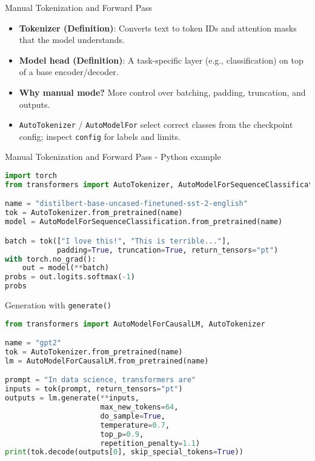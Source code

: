 \documentclass[aspectratio=169]{beamer}
\begin{document}
\begin{frame}[fragile]{Manual Tokenization and Forward Pass}
  \begin{itemize}
    \item \textbf{Tokenizer (Definition)}: Converts text to token IDs and attention masks that the model understands.
    \item \textbf{Model head (Definition)}: A task-specific layer (e.g., classification) on top of a base encoder/decoder.
    \item \textbf{Why manual mode?} More control over batching, padding, truncation, and outputs.
    \item \texttt{AutoTokenizer} / \texttt{AutoModelFor\*} select correct classes from the checkpoint config; inspect \texttt{config} for labels and limits.
  \end{itemize}
\end{frame}
\begin{frame}[fragile]{Manual Tokenization and Forward Pass - Python example}
  \begin{lstlisting}[language=Python]
import torch
from transformers import AutoTokenizer, AutoModelForSequenceClassification

name = "distilbert-base-uncased-finetuned-sst-2-english"
tok = AutoTokenizer.from_pretrained(name)
model = AutoModelForSequenceClassification.from_pretrained(name)

batch = tok(["I love this!", "This is terrible..."],
            padding=True, truncation=True, return_tensors="pt")
with torch.no_grad():
    out = model(**batch)
probs = out.logits.softmax(-1)
probs
  \end{lstlisting}


\end{frame}

\begin{frame}[fragile]{Generation with \texttt{generate()}}
  \begin{lstlisting}[language=Python]
from transformers import AutoModelForCausalLM, AutoTokenizer

name = "gpt2"
tok = AutoTokenizer.from_pretrained(name)
lm = AutoModelForCausalLM.from_pretrained(name)

prompt = "In data science, transformers are"
inputs = tok(prompt, return_tensors="pt")
outputs = lm.generate(**inputs,
                      max_new_tokens=64,
                      do_sample=True,
                      temperature=0.7,
                      top_p=0.9,
                      repetition_penalty=1.1)
print(tok.decode(outputs[0], skip_special_tokens=True))
  \end{lstlisting}
\end{frame}
\end{document}

